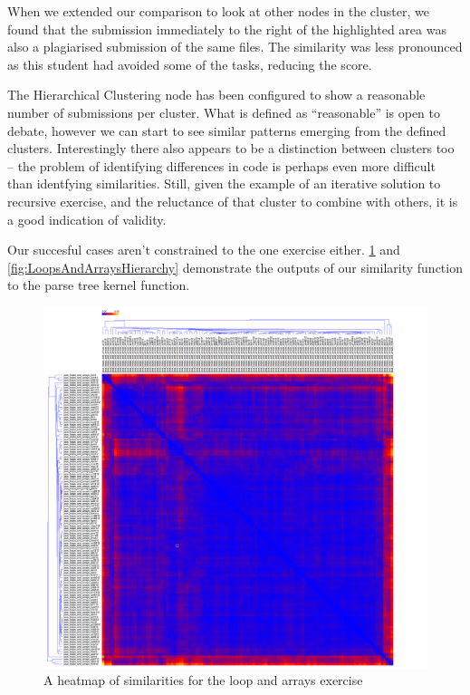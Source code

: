 When we extended our comparison to look at other nodes in the cluster, we found
that the submission immediately to the right of the highlighted area was also
a plagiarised submission of the same files. The similarity was less pronounced
as this student had avoided some of the tasks, reducing the score.

The Hierarchical Clustering node has been configured to show a reasonable number
of submissions per cluster. What is defined as ``reasonable'' is open to debate,
however we can start to see similar patterns emerging from the defined clusters.
Interestingly there also appears to be a distinction between clusters too --
the problem of identifying differences in code is perhaps even more difficult
than identfying similarities. Still, given the example of an iterative solution
to recursive exercise, and the reluctance of that cluster to combine with others,
it is a good indication of validity.

Our succesful cases aren't constrained to the one exercise either. 
\cref{fig:LoopsAndArraysHeatmap} and \cref{fig:LoopsAndArraysHierarchy}
demonstrate the outputs of our similarity function to the parse tree kernel
function.



\begin{figure}[h!]

	\centering
		\includegraphics[width=1.2\textwidth]{Figures/LoopArrayHeatmap}
	\caption{A heatmap of similarities for the loop and arrays exercise}
	\label{fig:LoopsAndArraysHeatmap}

\end{figure}

